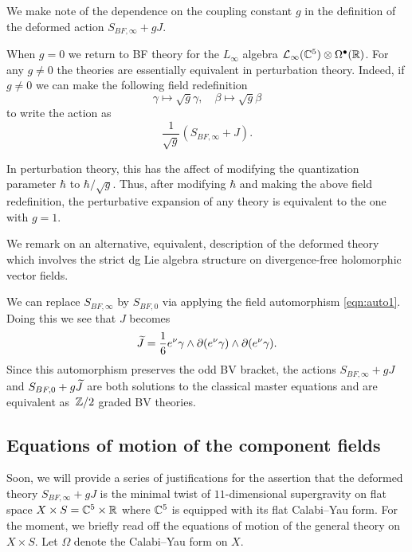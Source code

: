 \parsec[s:coupling]

We make note of the dependence on the coupling constant $g$ in the definition of the deformed action $S_{BF,\infty} + g J$. 

When $g = 0$ we return to BF theory for the $L_\infty$ algebra $\mathcal L_\infty(\mathbb C^5) \otimes \Omega^\bullet(\mathbb R)$. 
For any $g \ne 0$ the theories are essentially equivalent in perturbation theory. 
Indeed, if $g \ne 0$ we can make the following field redefinition 
\[
\gamma \mapsto \sqrt{g} \gamma, \quad \beta \mapsto \sqrt{g} \beta 
\]
to write the action as 
\[
\frac{1}{\sqrt{g}} \left(S_{BF,\infty} + J \right)  .
\]

In perturbation theory, this has the affect of modifying the quantization parameter $\hbar$ to $\hbar / \sqrt{g}$.
Thus, after modifying $\hbar$ and making the above field redefinition, the perturbative expansion of any theory is equivalent to the one with $g = 1$. 

\parsec[s:altdfn]

We remark on an alternative, equivalent, description of the deformed theory which involves the strict dg Lie algebra structure on divergence-free holomorphic vector fields.

We can replace $S_{BF,\infty}$ by $S_{BF,0}$ via applying the field automorphism \eqref{eqn:auto1}.
Doing this we see that $J$ becomes 
\[
\widetilde{J} = \frac16 e^\nu \gamma \wedge \partial (e^\nu \gamma) \wedge \partial(e^\nu \gamma) .
\]
Since this automorphism preserves the odd BV bracket, the actions $S_{BF,\infty} + g J$ and $S_{BF, 0} + g \widetilde{J}$ are both solutions to the classical master equations and are equivalent as~$\mathbb Z/2$ graded BV theories.

\subsection{Equations of motion of the component fields} \label{s:components}

Soon, we will provide a series of justifications for the assertion that the deformed theory $S_{BF, \infty} + g J$ is the minimal twist of $11$-dimensional supergravity on flat space $X \times S = \mathbb C^5 \times \mathbb R$ where $\mathbb C^5$ is equipped with its flat Calabi--Yau form. 
For the moment, we briefly read off the equations of motion of the general theory on $X \times S$.
Let $\Omega$ denote the Calabi--Yau form on $X$. 

